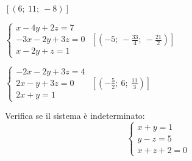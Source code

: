 \begin{esercizio}[\Ast]
\begin{multicols}{2}
\begin{enumeratea}
 \hfill $\left[(6;~11;~-8)\right]$
\item $\left\{\begin{array}{l}x-4y+2z=7 \\-3x-2y+3z=0 \\x-2y+z=1 
\end{array}\right.$
 \hfill $\left[\left(-5;~-\frac{33}{4};~-\frac{21}{2}\right)\right]$
\item $\left\{\begin{array}{l}-2x-2y+3z=4 \\2x-y+3z=0\\2x+y=1 
\end{array}\right.$
 \hfill $\left[\left(-{\frac{5}{2}};~6;~\frac{11}{3}\right)\right]$
\end{enumeratea}
\end{multicols}
\end{esercizio}

% 

\begin{esercizio}
 \label{ese:22.62}
Verifica se il sistema è indeterminato:
\[\left\{\begin{array}{l}x+y=1 \\y-z=5
\\x+z+2=0 \end{array}\right.\]
\end{esercizio}

